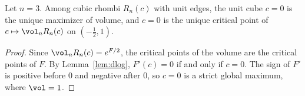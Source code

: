 \begin{theorem}\label{thm:main}
Let $n=3$. Among cubic rhombi $R_n(c)$ with unit edges, the unit cube $c=0$ is the unique maximizer of volume, and $c=0$ is the unique critical point of $c\mapsto\vol_nR_n(c)$ on $(- \frac{1}{2},1)$.
\end{theorem}
\begin{proof}
Since $\vol_nR_n(c)=e^{F/2}$, the critical points of the volume are the critical points of $F$.
By Lemma~\ref{lem:dlog}, $F'(c)=0$ if and only if $c=0$.
The sign of $F'$ is positive before $0$ and negative after $0$, so $c=0$ is a strict global maximum, where $\vol=1$.
\end{proof}
